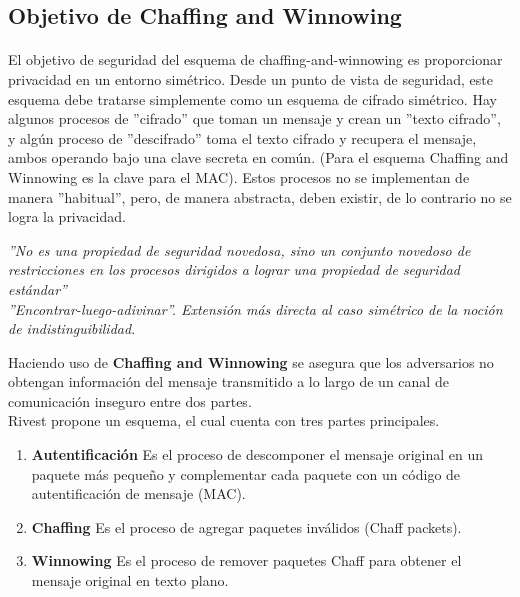 \documentclass[12pt, a4paper, titlepage]{report}
\begin{document}
		\subsection{Objetivo de Chaffing and Winnowing}
		
		\paragraph{}
		El objetivo de seguridad del esquema de chaffing-and-winnowing es proporcionar privacidad en un entorno simétrico. 
        Desde un punto de vista de seguridad, este esquema debe tratarse simplemente como un esquema de cifrado simétrico. Hay algunos procesos de ''cifrado'' que toman un mensaje y crean un ''texto cifrado'', y algún proceso de ''descifrado'' toma el texto cifrado y recupera el mensaje, ambos operando bajo una clave secreta en com\'un. (Para el esquema Chaffing and Winnowing es la clave para el MAC). Estos procesos no se implementan de manera ''habitual'', pero, de manera abstracta, deben existir, de lo contrario no se logra la privacidad.  \cite{refRivestSeguridad} \cite{refEncontrarLuegoAdivinar}  
        \begin{center}
            \textit{''No es una propiedad de seguridad novedosa, sino un conjunto novedoso de restricciones en los procesos dirigidos a lograr una propiedad de seguridad estándar''\\
            ''Encontrar-luego-adivinar''. Extensión más directa al caso simétrico de la noción de indistinguibilidad.}
        \end{center}
		
		Haciendo uso de \textbf{Chaffing and Winnowing} se asegura que los adversarios no obtengan información del mensaje transmitido a lo largo de un canal de comunicación inseguro entre dos partes. \\
		Rivest propone un esquema, el cual cuenta con tres partes principales. \cite{refChaffing}
		\begin{enumerate}
		    \item \textbf{Autentificación} Es el proceso de descomponer el mensaje original en un paquete más pequeño y complementar cada paquete con un código de autentificación de mensaje (MAC).
		    \item \textbf{Chaffing} Es el proceso de agregar paquetes inválidos (Chaff packets).
		    \item \textbf{Winnowing} Es el proceso de remover paquetes Chaff para obtener el mensaje original en texto plano.
		\end{enumerate}
		
\end{document}
